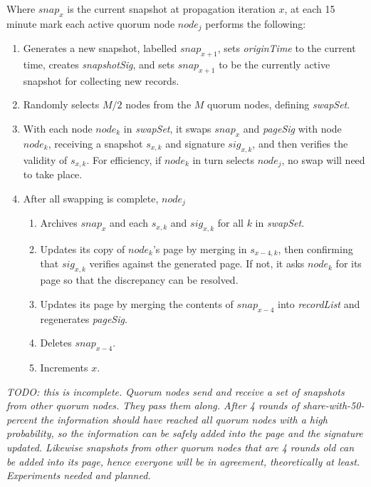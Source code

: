 
Where $ snap_{x} $ is the current snapshot at propagation iteration $ x $, at each 15 minute mark each active quorum node $ node_{j} $ performs the following:

\begin{enumerate}
	\item Generates a new snapshot, labelled $ snap_{x+1} $, sets \textit{originTime} to the current time, creates \textit{snapshotSig}, and sets $ snap_{x+1} $ to be the currently active snapshot for collecting new records.
	\item Randomly selects $ M / 2 $ nodes from the $ M $ quorum nodes, defining \textit{swapSet}.
	\item With each node $ node_{k} $ in \textit{swapSet}, it swaps $ snap_{x} $ and \textit{pageSig} with node $ node_{k} $, receiving a snapshot $ s_{x, k} $ and signature $ sig_{x, k} $, and then verifies the validity of $ s_{x, k} $. For efficiency, if $ node_{k} $ in turn selects $ node_{j} $, no swap will need to take place.
	\item After all swapping is complete, $ node_{j} $
		\begin{enumerate}
			\item Archives $ snap_{x} $ and each $ s_{x, k} $ and $ sig_{x, k} $ for all $ k $ in \textit{swapSet}.
			\item Updates its copy of $ node_{k} $'s page by merging in $ s_{x-4, k} $, then confirming that $ sig_{x, k} $ verifies against the generated page. If not, it asks $ node_{k} $ for its page so that the discrepancy can be resolved.
			\item Updates its page by merging the contents of $ snap_{x-4} $ into \textit{recordList} and regenerates \textit{pageSig}.
			\item Deletes $ snap_{x-4} $.
			\item Increments $ x $.
		\end{enumerate}
\end{enumerate}


\textit{TODO: this is incomplete. Quorum nodes send and receive a set of snapshots from other quorum nodes. They pass them along. After 4 rounds of share-with-50-percent the information should have reached all quorum nodes with a high probability, so the information can be safely added into the page and the signature updated. Likewise snapshots from other quorum nodes that are 4 rounds old can be added into its page, hence everyone will be in agreement, theoretically at least. Experiments needed and planned.}

